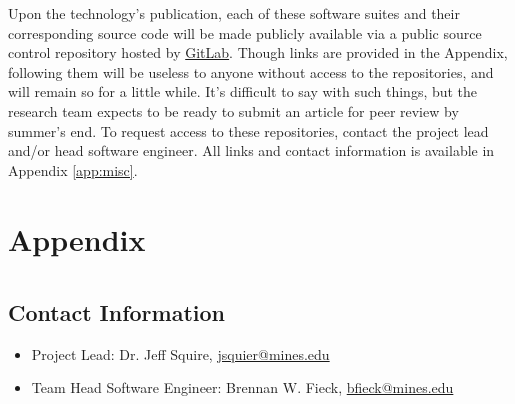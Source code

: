 \documentclass[12pt]{article}
\begin{document}
Upon the technology's publication, each of these software suites and their
corresponding source code will be made publicly available via a public
source control repository hosted by \href{http://www.gitlab.com}{GitLab}. Though links are provided in the Appendix,
following them will be useless to anyone without access to the
repositories, and will remain so for a little while. It's difficult to say with such things, but the research team expects to be ready to submit an article for peer review by summer's end. To request
access to these repositories, contact the project lead and/or head
software engineer. All links and contact information is available in
Appendix \ref{app:misc}.

\newpage
\section*{Appendix}
\appendix

\section{\label{app:misc}}
\subsection{Contact Information}
\begin{itemize}
\item Project Lead: Dr. Jeff Squire, \href{mailto:jsquier@mines.edu}{jsquier@mines.edu}
\item Team Head Software Engineer: Brennan W. Fieck, \href{mailto:bfieck@mymail.mines.edu}{bfieck@mines.edu}
\end{itemize}
\end{document}

